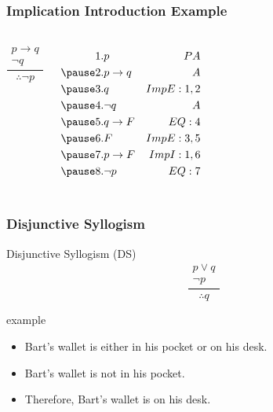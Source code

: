 \documentclass[dvipsnames]{beamer}
\begin{document}
\begin{frame}
  \frametitle{Implication Introduction Example}

  \begin{columns}
    \[
    \frac
      {
        \begin{array}{c}
          p \rightarrow q\\
          \neg q
        \end{array}
      }
      {
        \therefore \neg p
      }
    \]

    \pause
    \begin{eqnarray*}
      1. & p                         & PA\\
      \pause
      2. & p \rightarrow q           & A\\
      \pause
      3. & q                         & ImpE:1,2\\
      \pause
      4. & \neg q                    & A\\
      \pause
      5. & q \rightarrow F           & EQ:4\\
      \pause
      6. & F                         & ImpE:3,5\\
      \pause
      7. & p \rightarrow F           & ImpI:1,6\\
      \pause
      8. & \neg p                    & EQ:7\\
    \end{eqnarray*}
  \end{columns}
\end{frame}

\begin{frame}
  \frametitle{Disjunctive Syllogism}

  \begin{block}{Disjunctive Syllogism (DS)}
    \[
    \frac
      {
        \begin{array}{c}
          p \vee q\\
          \neg p
        \end{array}
      }
      {
        \therefore q
      }
    \]
  \end{block}

  \pause
  \begin{exampleblock}{example}
    \begin{itemize}
      \item Bart's wallet is either in his pocket or on his desk.
      \item Bart's wallet is not in his pocket.

      \medskip
      \item Therefore, Bart's wallet is on his desk.
    \end{itemize}
  \end{exampleblock}
\end{frame}
\end{document}

